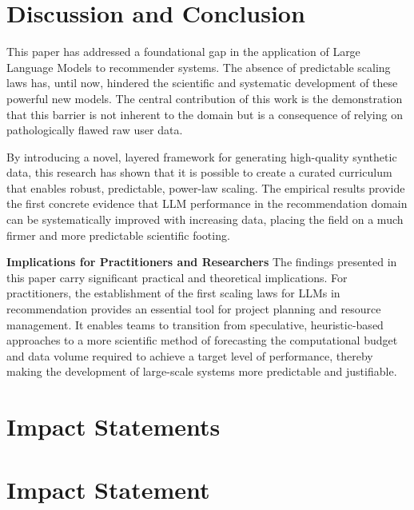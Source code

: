 \documentclass[]{fairmeta}
\newcommand{\jh}[1]{\iftoggle{comment}{\textcolor{orange}{[JH: #1]}}{}}
\begin{document}
\section{Discussion and Conclusion} 
This paper has addressed a foundational gap in the application of Large Language Models to recommender systems. The absence of predictable scaling laws has, until now, hindered the scientific and systematic development of these powerful new models. The central contribution of this work is the demonstration that this barrier is not inherent to the domain but is a consequence of relying on pathologically flawed raw user data.

By introducing a novel, layered framework for generating high-quality synthetic data, this research has shown that it is possible to create a curated curriculum that enables robust, predictable, power-law scaling. The empirical results provide the first concrete evidence that LLM performance in the recommendation domain can be systematically improved with increasing data, placing the field on a much firmer and more predictable scientific footing.

\textbf{Implications for Practitioners and Researchers} The findings presented in this paper carry significant practical and theoretical implications. For practitioners, the establishment of the first scaling laws for LLMs in recommendation provides an essential tool for project planning and resource management. It enables teams to transition from speculative, heuristic-based approaches to a more scientific method of forecasting the computational budget and data volume required to achieve a target level of performance, thereby making the development of large-scale systems more predictable and justifiable.

\section{Impact Statements}

  \section*{Impact Statement}
\end{document}
